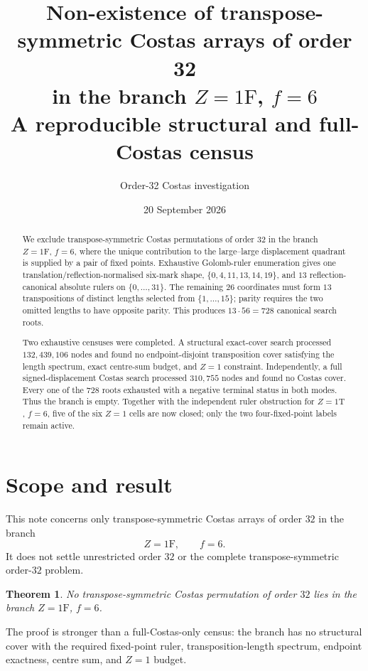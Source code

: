 \documentclass[11pt,a4paper]{article}
\title{\textbf{Non-existence of transpose-symmetric Costas arrays of order 32\\in the branch $Z=1\mathrm F$, $f=6$}\\[1ex]\large A reproducible structural and full-Costas census}
\author{Order-32 Costas investigation}
\date{20 September 2026}
\newtheorem{theorem}{Theorem}[section]\newtheorem{lemma}[theorem]{Lemma}\theoremstyle{definition}\newtheorem{definition}[theorem]{Definition}
\begin{document}
\maketitle
\begin{abstract}
We exclude transpose-symmetric Costas permutations of order $32$ in the branch $Z=1\mathrm F$, $f=6$, where the unique contribution to the large--large displacement quadrant is supplied by a pair of fixed points. Exhaustive Golomb-ruler enumeration gives one translation/reflection-normalised six-mark shape, $\{0,4,11,13,14,19\}$, and $13$ reflection-canonical absolute rulers on $\{0,\ldots,31\}$. The remaining $26$ coordinates must form $13$ transpositions of distinct lengths selected from $\{1,\ldots,15\}$; parity requires the two omitted lengths to have opposite parity. This produces $13\cdot56=728$ canonical search roots.

Two exhaustive censuses were completed. A structural exact-cover search processed $132{,}439{,}106$ nodes and found no endpoint-disjoint transposition cover satisfying the length spectrum, exact centre-sum budget, and $Z=1$ constraint. Independently, a full signed-displacement Costas search processed $310{,}755$ nodes and found no Costas cover. Every one of the $728$ roots exhausted with a negative terminal status in both modes. Thus the branch is empty. Together with the independent ruler obstruction for $Z=1\mathrm T$, $f=6$, five of the six $Z=1$ cells are now closed; only the two four-fixed-point labels remain active.
\end{abstract}
\tableofcontents\newpage

\section{Scope and result}
This note concerns only transpose-symmetric Costas arrays of order $32$ in the branch
\[
\boxed{Z=1\mathrm F,\qquad f=6.}
\]
It does not settle unrestricted order $32$ or the complete transpose-symmetric order-$32$ problem.

\begin{theorem}
No transpose-symmetric Costas permutation of order $32$ lies in the branch $Z=1\mathrm F$, $f=6$.
\end{theorem}
The proof is stronger than a full-Costas-only census: the branch has no structural cover with the required fixed-point ruler, transposition-length spectrum, endpoint exactness, centre sum, and $Z=1$ budget.
\end{document}
